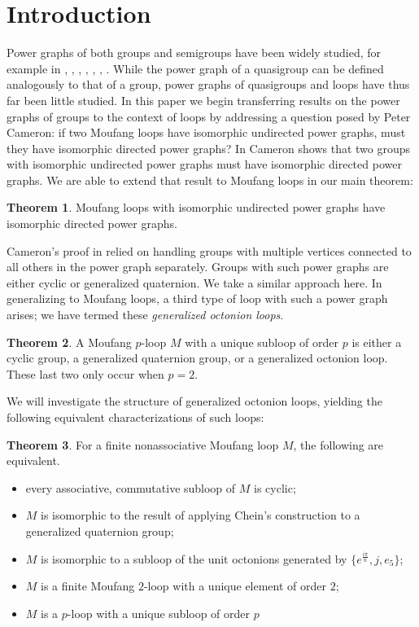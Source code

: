 \documentclass[12pt]{report}
\theoremstyle{definition}
\newtheorem{thm}{Theorem}[chapter]
\begin{document}
\section{Introduction}

Power graphs of both groups and semigroups have been widely studied, for example in \cite{EPG}, \cite{PG},
  \cite{PGII}, \cite{Tor}, \cite{Feng}, \cite{Mog}, \cite{Panda}. While the power graph of a quasigroup
  can be defined analogously to that of a group, power graphs of quasigroups and loops have thus far been
  little studied. In this paper we begin transferring results on the power graphs of groups to the context
  of loops by addressing a question posed by Peter Cameron: if two Moufang loops have isomorphic undirected
  power graphs, must they have isomorphic directed power graphs? In \cite{PGII} Cameron shows that two groups
  with isomorphic undirected power graphs must have isomorphic directed power graphs. We are able to extend
  that result to Moufang loops in our main theorem:

\begin{thm}\label{mainThm}
  Moufang loops with isomorphic undirected power graphs have isomorphic directed power graphs.
\end{thm}

Cameron's proof in \cite{PGII} relied on handling groups with multiple vertices connected to all others in
  the power graph separately. Groups with such power graphs are either cyclic or generalized quaternion. We
  take a similar approach here. In generalizing to Moufang loops, a third type of loop with such a power graph
  arises; we have termed these \textit{generalized octonion loops}. 

\begin{thm}\label{moufangDesc2}
  A Moufang $p$-loop $M$ with a unique subloop of order $p$ is either a cyclic group, a generalized quaternion
    group, or a generalized octonion loop. These last two only occur when $p = 2$.
\end{thm}

We will investigate the structure of generalized octonion loops, yielding the following equivalent
  characterizations of such loops:

\begin{thm}\label{genOct}
  For a finite nonassociative Moufang loop $M$, the following are equivalent.
  \begin{itemize}
    \item every associative, commutative subloop of $M$ is cyclic;
    \item $M$ is isomorphic to the result of applying Chein's construction to a generalized quaternion group;
    \item $M$ is isomorphic to a subloop of the unit octonions generated by $\{e^{\frac{i\pi}{n}}, j, e_5\}$;
    \item $M$ is a finite Moufang $2$-loop with a unique element of order $2$;
    \item $M$ is a $p$-loop with a unique subloop of order $p$
  \end{itemize}
\end{thm}
\end{document}
